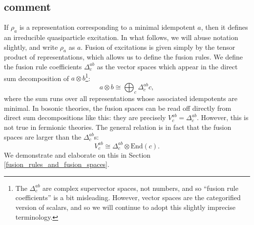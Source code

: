 \documentclass[12pt,a4paper]{article}
\newcommand{\tp}{\otimes}
\newcommand\be            {\begin{equation}}
\newcommand\ee            {\end{equation}}
\newcommand{\End}{\text{End}}
\begin{document}
\subsection{comment}
If $\rho_a$ is a representation corresponding to a minimal idempotent $a$, 
then it defines an irreducible quasiparticle excitation.
In what follows, we will abuse notation slightly, and write $\rho_a$ as $a$. 
Fusion of excitations is given simply by the tensor product of representations, which allows us to define the fusion rules.
We define the fusion rule coefficients $\Delta^{ab}_c$ as the vector spaces which appear 
in the direct sum decomposition of $a\tp b$\footnote{The $\Delta^{ab}_c$ are complex 
supervector spaces, not numbers, and so ``fusion rule coefficients'' is a bit misleading. 
However, vector spaces are the categorified version of scalars, and so we will continue to 
adopt this slightly imprecise terminology.}:
\be \label{fusion_coeffs_defn} a \tp b \cong \bigoplus_c \Delta^{ab}_ c c,\ee
where the sum runs over all representations whose associated idempotents are minimal. 
In bosonic theories, the fusion spaces can be read off directly from direct sum decompositions 
like this: they are precisely $V^{ab}_c = \Delta^{ab}_c$. 
However, this is not true in fermionic theories. 
The general relation is in fact that the fusion spaces are larger than the $\Delta^{ab}_c$s:
\be V^{ab}_c \cong \Delta^{ab}_c \tp \End(c).\ee
We demonstrate and elaborate on this in Section \ref{fusion_rules_and_fusion_spaces}. 
 
 
\end{document}
